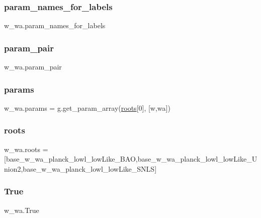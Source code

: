 \subsubsection{\texorpdfstring{param\+\_\+names\+\_\+for\+\_\+labels}{param\_names\_for\_labels}}
{\footnotesize\ttfamily w\+\_\+wa.\+param\+\_\+names\+\_\+for\+\_\+labels}

\mbox{\label{namespacew__wa_acbd0a558bd7b2188c665960e86e9b258}} 
\subsubsection{\texorpdfstring{param\+\_\+pair}{param\_pair}}
{\footnotesize\ttfamily w\+\_\+wa.\+param\+\_\+pair}

\mbox{\label{namespacew__wa_a2e7c83bd1808be199b30a726b1536f23}} 
\subsubsection{\texorpdfstring{params}{params}}
{\footnotesize\ttfamily w\+\_\+wa.\+params = g.\+get\+\_\+param\+\_\+array(\mbox{\hyperlink{namespacew__wa_a6cae39e601157fb0f473f6a4e6a6602e}{roots}}\mbox{[}0\mbox{]}, \mbox{[}\textquotesingle{}w\textquotesingle{},\textquotesingle{}wa\textquotesingle{}\mbox{]})}

\mbox{\label{namespacew__wa_a6cae39e601157fb0f473f6a4e6a6602e}} 
\subsubsection{\texorpdfstring{roots}{roots}}
{\footnotesize\ttfamily w\+\_\+wa.\+roots = \mbox{[}\textquotesingle{}base\+\_\+w\+\_\+wa\+\_\+planck\+\_\+lowl\+\_\+low\+Like\+\_\+\+B\+AO\textquotesingle{},\textquotesingle{}base\+\_\+w\+\_\+wa\+\_\+planck\+\_\+lowl\+\_\+low\+Like\+\_\+\+Union2\textquotesingle{},\textquotesingle{}base\+\_\+w\+\_\+wa\+\_\+planck\+\_\+lowl\+\_\+low\+Like\+\_\+\+S\+N\+LS\textquotesingle{}\mbox{]}}

\mbox{\label{namespacew__wa_a60b56251b36dfe49364910aa7e83a794}} 
\subsubsection{\texorpdfstring{True}{True}}
{\footnotesize\ttfamily w\+\_\+wa.\+True}

